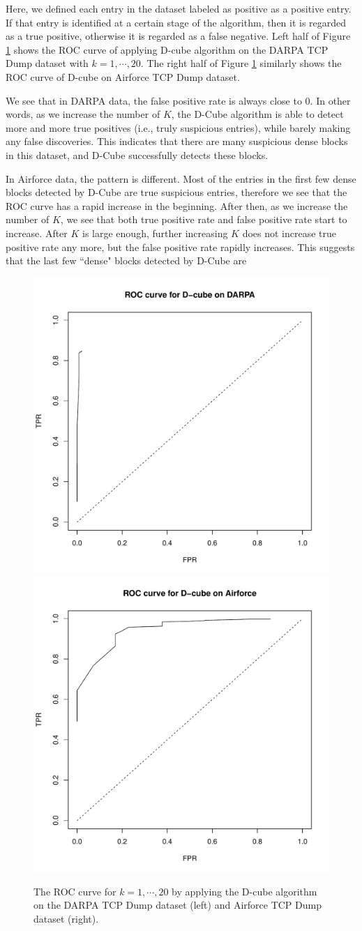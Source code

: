 Here, we defined each entry in the dataset labeled as positive as a positive entry. If that entry is identified at a certain stage of the algorithm, then it is regarded as a true positive, otherwise it is regarded as a false negative. Left half of Figure \ref{fig: roc} shows the ROC curve of applying D-cube algorithm on the DARPA TCP Dump dataset with $k = 1, \cdots, 20$. The right half of Figure \ref{fig: roc} similarly shows the ROC curve of D-cube on Airforce TCP Dump dataset. 

We see that in DARPA data, the false positive rate is always close to 0. In other words, as we increase the number of $K$, the D-Cube algorithm is able to detect more and more true positives (i.e., truly suspicious entries), while barely making any false discoveries. This indicates that there are many suspicious dense blocks in this dataset, and D-Cube successfully detects these blocks. 

In Airforce data, the pattern is different. Most of the entries in the first few dense blocks detected by D-Cube are true suspicious entries, therefore we see that the ROC curve has a rapid increase in the beginning. After then, as we increase the number of $K$, we see that both true positive rate and false positive rate start to increase. After $K$ is large enough, further increasing $K$ does not increase true positive rate any more, but the false positive rate rapidly increases. This suggests that the last few ``dense" blocks detected by D-Cube are 

\begin{figure}[htbp]
\centering 
\includegraphics[width=.45\columnwidth]{plots/darpa_ROC.pdf} 
\includegraphics[width=.45\columnwidth]{plots/airforce_ROC.pdf} 
\caption{The ROC curve for $k = 1, \cdots, 20$ by applying the D-cube algorithm on the DARPA TCP Dump dataset (left) and Airforce TCP Dump dataset (right). }
\label{fig: roc}
\end{figure}


